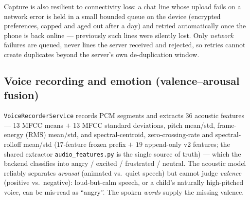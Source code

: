 \documentclass[11pt,a4paper]{article}
\begin{document}
Capture is also resilient to connectivity loss: a chat line whose upload fails on a
network error is held in a small bounded queue on the device (encrypted preferences,
capped and aged out after a day) and retried automatically once the phone is back
online --- previously such lines were silently lost. Only \emph{network} failures are
queued, never lines the server received and rejected, so retries cannot create
duplicates beyond the server's own de-duplication window.

\subsection{Voice recording and emotion (valence--arousal fusion)}
\texttt{VoiceRecorderService} records PCM segments and extracts 36 acoustic features
--- 13 MFCC means $+$ 13 MFCC standard deviations, pitch mean/std, frame-energy
(RMS) mean/std, and spectral-centroid, zero-crossing-rate and spectral-rolloff
mean/std ($17$-feature frozen prefix $+$ $19$ append-only v2 features; the shared
extractor \texttt{audio\_features.py} is the single source of truth) --- which the
backend classifies into
angry / excited / frustrated / neutral. The acoustic model reliably separates
\emph{arousal} (animated vs.\ quiet speech) but cannot judge \emph{valence} (positive
vs.\ negative): loud-but-calm speech, or a child's naturally high-pitched voice, can be
mis-read as ``angry''. The spoken \emph{words} supply the missing valence.
\end{document}
